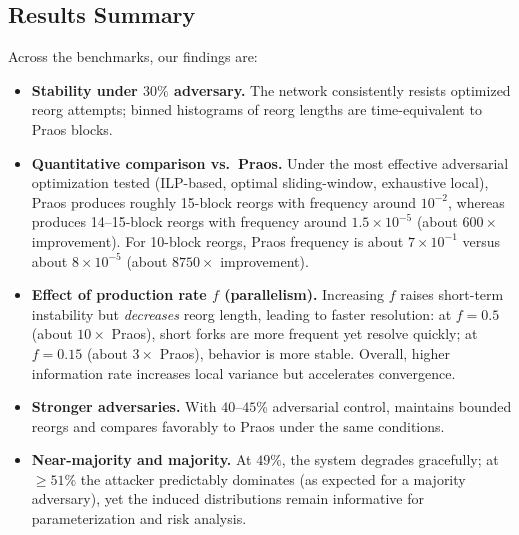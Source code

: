 \subsection{Results Summary}
Across the benchmarks, our findings are:
\begin{itemize}
	\item \textbf{Stability under $30\%$ adversary.} The network consistently resists optimized reorg attempts; binned histograms of reorg lengths are time-equivalent to Praos blocks.
	\item \textbf{Quantitative comparison vs.\ Praos.} Under the most effective adversarial optimization tested (ILP-based, optimal sliding-window, exhaustive local), Praos produces roughly 15-block reorgs with frequency around $10^{-2}$, whereas \ProjBase{} produces 14--15-block reorgs with frequency around $1.5\times 10^{-5}$ (about $600\times$ improvement). For 10-block reorgs, Praos frequency is about $7\times 10^{-1}$ versus \ProjBase{} about $8\times 10^{-5}$ (about $8750\times$ improvement).
	\item \textbf{Effect of production rate $f$ (parallelism).} Increasing $f$ raises short-term instability but \emph{decreases} reorg length, leading to faster resolution: at $f{=}0.5$ (about $10\times$ Praos), short forks are more frequent yet resolve quickly; at $f{=}0.15$ (about $3\times$ Praos), behavior is more stable. Overall, higher information rate increases local variance but accelerates convergence.
	\item \textbf{Stronger adversaries.} With $40$--$45\%$ adversarial control, \ProjBase{} maintains bounded reorgs and compares favorably to Praos under the same conditions.
	\item \textbf{Near-majority and majority.} At $49\%$, the system degrades gracefully; at $\ge 51\%$ the attacker predictably dominates (as expected for a majority adversary), yet the induced distributions remain informative for parameterization and risk analysis.
\end{itemize}